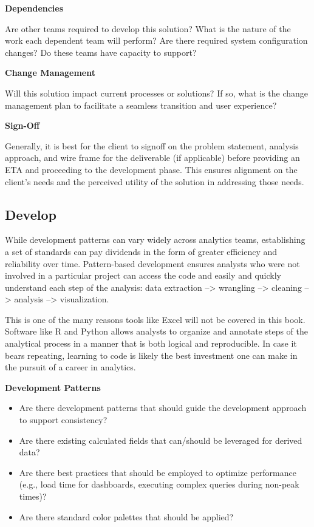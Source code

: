 \documentclass[
]{book}
\providecommand{\tightlist}{%
  \setlength{\itemsep}{0pt}\setlength{\parskip}{0pt}}
\begin{document}
\textbf{Dependencies}

Are other teams required to develop this solution? What is the nature of the work each dependent team will perform? Are there required system configuration changes? Do these teams have capacity to support?

\textbf{Change Management}

Will this solution impact current processes or solutions? If so, what is the change management plan to facilitate a seamless transition and user experience?

\textbf{Sign-Off}

Generally, it is best for the client to signoff on the problem statement, analysis approach, and wire frame for the deliverable (if applicable) before providing an ETA and proceeding to the development phase. This ensures alignment on the client's needs and the perceived utility of the solution in addressing those needs.

\hypertarget{develop}{%
\subsection{Develop}\label{develop}}

While development patterns can vary widely across analytics teams, establishing a set of standards can pay dividends in the form of greater efficiency and reliability over time. Pattern-based development ensures analysts who were not involved in a particular project can access the code and easily and quickly understand each step of the analysis: data extraction --\textgreater{} wrangling --\textgreater{} cleaning --\textgreater{} analysis --\textgreater{} visualization.

This is one of the many reasons tools like Excel will not be covered in this book. Software like R and Python allows analysts to organize and annotate steps of the analytical process in a manner that is both logical and reproducible. In case it bears repeating, learning to code is likely the best investment one can make in the pursuit of a career in analytics.

\textbf{Development Patterns}

\begin{itemize}
\tightlist
\item
  Are there development patterns that should guide the development approach to support consistency?
\item
  Are there existing calculated fields that can/should be leveraged for derived data?
\item
  Are there best practices that should be employed to optimize performance (e.g., load time for dashboards, executing complex queries during non-peak times)?
\item
  Are there standard color palettes that should be applied?
\end{itemize}
\end{document}
